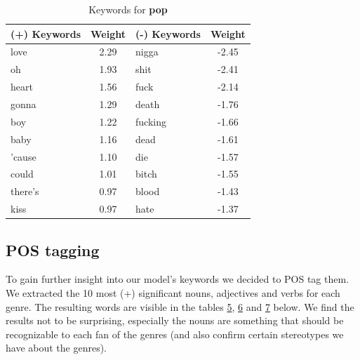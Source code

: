 \documentclass[a4paper,11pt]{article}
\begin{document}
\begin{table}[h!]
\centering
\label{baseline}
\begin{tabular}{|lc|lc|}
\hline
(+) Keywords & Weight & (-) Keywords & Weight \\
\hline
love & 2.29 & nigga & -2.45 \\
oh & 1.93 & shit & -2.41 \\
heart & 1.56 & fuck & -2.14 \\
gonna & 1.29 & death & -1.76 \\
boy & 1.22 & fucking & -1.66 \\
baby & 1.16 & dead & -1.61 \\
'cause & 1.10 & die & -1.57 \\
could & 1.01 & bitch & -1.55 \\
there's & 0.97 & blood & -1.43 \\
kiss & 0.97 & hate & -1.37 \\
\hline
\end{tabular}
\caption{Keywords for \textbf{pop}}
\end{table}

\subsection{POS tagging}

To gain further insight into our model's keywords we decided to POS tag them.
We extracted the 10 most (+) significant nouns, adjectives and verbs for each genre.
The resulting words are visible in the tables \hyperref[label-hip-hop-pos]{5}, \hyperref[label-metal-pos]{6} and \hyperref[label-pop-pos]{7} below.
We find the results not to be surprising, especially the nouns are something that should be recognizable to each fan of the genres (and also confirm certain stereotypes we have about the genres).
\end{document}
